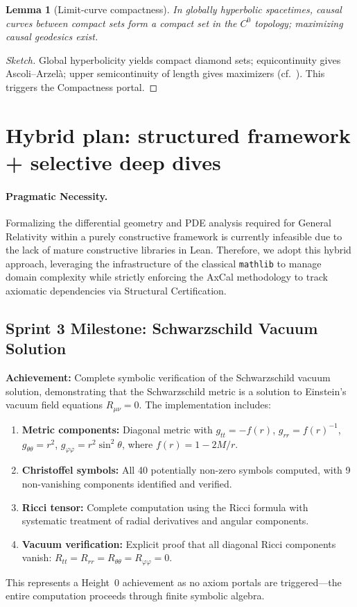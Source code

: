 \documentclass[11pt]{article}
\newtheorem{lemma}[theorem]{Lemma}
\theoremstyle{definition}
\theoremstyle{remark}
\begin{document}
\begin{lemma}[Limit-curve compactness]\label{lem:limitcurve}
In globally hyperbolic spacetimes, causal curves between compact sets form a compact set in the $C^0$ topology; maximizing causal geodesics exist.
\end{lemma}
\begin{proof}[Sketch]
Global hyperbolicity yields compact diamond sets; equicontinuity gives Ascoli--Arzelà; upper semicontinuity of length gives maximizers (cf.\ \cite[§14]{Wald1984}). This triggers the Compactness portal.
\end{proof}

\section{Hybrid plan: structured framework + selective deep dives}

\paragraph{Pragmatic Necessity.} Formalizing the differential geometry and PDE analysis required for General Relativity within a purely constructive framework is currently infeasible due to the lack of mature constructive libraries in Lean. Therefore, we adopt this hybrid approach, leveraging the infrastructure of the classical \texttt{mathlib} to manage domain complexity while strictly enforcing the AxCal methodology to track axiomatic dependencies via Structural Certification.

\subsection{Sprint 3 Milestone: Schwarzschild Vacuum Solution}
\textbf{Achievement:} Complete symbolic verification of the Schwarzschild vacuum solution, demonstrating that the Schwarzschild metric is a solution to Einstein's vacuum field equations $R_{\mu\nu} = 0$. The implementation includes:
\begin{enumerate}
\item \textbf{Metric components:} Diagonal metric with $g_{tt} = -f(r)$, $g_{rr} = f(r)^{-1}$, $g_{\theta\theta} = r^2$, $g_{\varphi\varphi} = r^2\sin^2\theta$, where $f(r) = 1 - 2M/r$.
\item \textbf{Christoffel symbols:} All 40 potentially non-zero symbols computed, with 9 non-vanishing components identified and verified.
\item \textbf{Ricci tensor:} Complete computation using the Ricci formula with systematic treatment of radial derivatives and angular components.
\item \textbf{Vacuum verification:} Explicit proof that all diagonal Ricci components vanish: $R_{tt} = R_{rr} = R_{\theta\theta} = R_{\varphi\varphi} = 0$.
\end{enumerate}
This represents a Height~0 achievement as no axiom portals are triggered—the entire computation proceeds through finite symbolic algebra.
\end{document}
